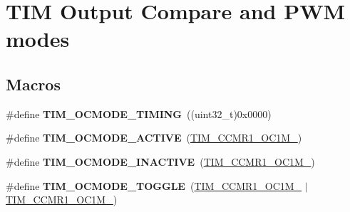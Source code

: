 \hypertarget{group___t_i_m___output___compare__and___p_w_m__modes}{\section{T\-I\-M Output Compare and P\-W\-M modes}
\label{group___t_i_m___output___compare__and___p_w_m__modes}
}
\subsection*{Macros}
\begin{DoxyCompactItemize}
\item 
\hypertarget{group___t_i_m___output___compare__and___p_w_m__modes_gafae6b98b4b854fbfffd9a5ebc59c8f61}{\#define {\bfseries T\-I\-M\-\_\-\-O\-C\-M\-O\-D\-E\-\_\-\-T\-I\-M\-I\-N\-G}~((uint32\-\_\-t)0x0000)}\label{group___t_i_m___output___compare__and___p_w_m__modes_gafae6b98b4b854fbfffd9a5ebc59c8f61}

\item 
\hypertarget{group___t_i_m___output___compare__and___p_w_m__modes_ga111d1023e3ac6ef5544775c3863b4b12}{\#define {\bfseries T\-I\-M\-\_\-\-O\-C\-M\-O\-D\-E\-\_\-\-A\-C\-T\-I\-V\-E}~(\hyperlink{group___peripheral___registers___bits___definition_ga410a4752a98081bad8ab3f72b28e7c5f}{T\-I\-M\-\_\-\-C\-C\-M\-R1\-\_\-\-O\-C1\-M\-\_})}\label{group___t_i_m___output___compare__and___p_w_m__modes_ga111d1023e3ac6ef5544775c3863b4b12}

\item 
\hypertarget{group___t_i_m___output___compare__and___p_w_m__modes_ga890fbb44fd16f2bce962983352d23f53}{\#define {\bfseries T\-I\-M\-\_\-\-O\-C\-M\-O\-D\-E\-\_\-\-I\-N\-A\-C\-T\-I\-V\-E}~(\hyperlink{group___peripheral___registers___bits___definition_ga8b5f6ec25063483641d6dc065d96d2b5}{T\-I\-M\-\_\-\-C\-C\-M\-R1\-\_\-\-O\-C1\-M\-\_})}\label{group___t_i_m___output___compare__and___p_w_m__modes_ga890fbb44fd16f2bce962983352d23f53}

\item 
\hypertarget{group___t_i_m___output___compare__and___p_w_m__modes_ga368f80fad76018e2bf76084522e47536}{\#define {\bfseries T\-I\-M\-\_\-\-O\-C\-M\-O\-D\-E\-\_\-\-T\-O\-G\-G\-L\-E}~(\hyperlink{group___peripheral___registers___bits___definition_ga410a4752a98081bad8ab3f72b28e7c5f}{T\-I\-M\-\_\-\-C\-C\-M\-R1\-\_\-\-O\-C1\-M\-\_} $\vert$ \hyperlink{group___peripheral___registers___bits___definition_ga8b5f6ec25063483641d6dc065d96d2b5}{T\-I\-M\-\_\-\-C\-C\-M\-R1\-\_\-\-O\-C1\-M\-\_})}\label{group___t_i_m___output___compare__and___p_w_m__modes_ga368f80fad76018e2bf76084522e47536}


\end{DoxyCompactItemize}
